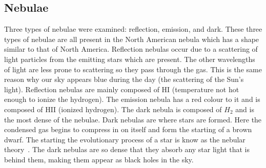 \documentclass{article}
\begin{document}
\subsection{Nebulae}
Three types of nebulae were examined: reflection, emission, and dark. These three types of
nebulae are all present in the North American nebula which has a shape similar to that of
North America. Reflection nebulas occur due to a scattering of light particles from the
emitting stars which are present. The other wavelengths of light are less prone to
scattering so they pass through the gas. This is the same reason why our sky appears
blue during the day (the scattering of the Sun's light). Reflection nebulas are mainly
composed of HI (temperature not hot enough to ionize the hydrogen). 
The emission nebula has a red colour to it and is composed of HII (ionized hydrogen).
The dark nebula is composed of $H_{2}$ and is the most dense of the nebulae. Dark nebulas
are where stars are formed. Here the condensed gas begins to compress in on itself and
form the starting of a brown dwarf. The starting the evolutionary process of a star is
know as the nebular theory~\cite{Abruzzo:2009}. 
The dark nebulas are so dense that they absorb any star
light that is behind them, making them appear as black holes in the sky.
\end{document}
